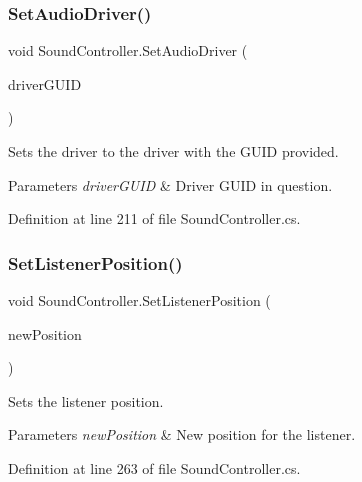 \subsubsection{\texorpdfstring{Set\+Audio\+Driver()}{SetAudioDriver()}\hspace{0.1cm}{\footnotesize\ttfamily [3/3]}}
{\footnotesize\ttfamily void Sound\+Controller.\+Set\+Audio\+Driver (\begin{DoxyParamCaption}\item[{System.\+Guid}]{driver\+G\+U\+ID }\end{DoxyParamCaption})}



Sets the driver to the driver with the G\+U\+ID provided. 


\begin{DoxyParams}{Parameters}
{\em driver\+G\+U\+ID} & Driver G\+U\+ID in question. \\
\hline
\end{DoxyParams}


Definition at line 211 of file Sound\+Controller.\+cs.

\mbox{\label{class_sound_controller_a8a3c0c2beb23a2908db39d9414aac1e8}} 
\subsubsection{\texorpdfstring{Set\+Listener\+Position()}{SetListenerPosition()}\hspace{0.1cm}{\footnotesize\ttfamily [1/2]}}
{\footnotesize\ttfamily void Sound\+Controller.\+Set\+Listener\+Position (\begin{DoxyParamCaption}\item[{Vector3}]{new\+Position }\end{DoxyParamCaption})}



Sets the listener position. 


\begin{DoxyParams}{Parameters}
{\em new\+Position} & New position for the listener.\\
\hline
\end{DoxyParams}


Definition at line 263 of file Sound\+Controller.\+cs.

